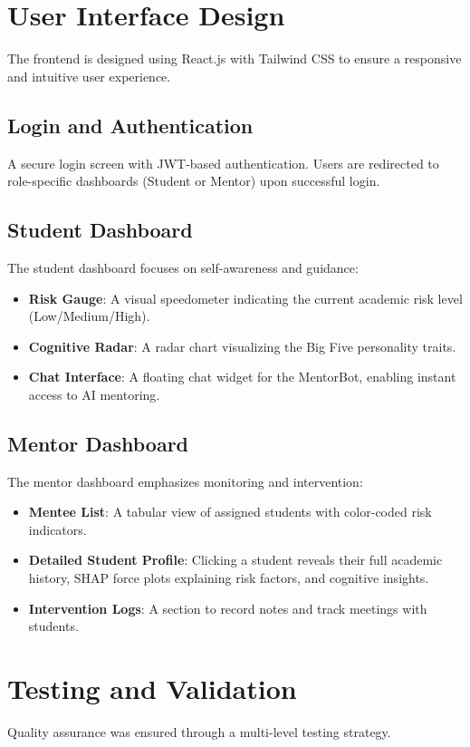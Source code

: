 \documentclass[12pt,a4paper]{report}
\begin{document}
\section{User Interface Design}
The frontend is designed using React.js with Tailwind CSS to ensure a responsive and intuitive user experience.

\subsection{Login and Authentication}
A secure login screen with JWT-based authentication. Users are redirected to role-specific dashboards (Student or Mentor) upon successful login.

\subsection{Student Dashboard}
The student dashboard focuses on self-awareness and guidance:
\begin{itemize}
    \item \textbf{Risk Gauge}: A visual speedometer indicating the current academic risk level (Low/Medium/High).
    \item \textbf{Cognitive Radar}: A radar chart visualizing the Big Five personality traits.
    \item \textbf{Chat Interface}: A floating chat widget for the MentorBot, enabling instant access to AI mentoring.
\end{itemize}

\subsection{Mentor Dashboard}
The mentor dashboard emphasizes monitoring and intervention:
\begin{itemize}
    \item \textbf{Mentee List}: A tabular view of assigned students with color-coded risk indicators.
    \item \textbf{Detailed Student Profile}: Clicking a student reveals their full academic history, SHAP force plots explaining risk factors, and cognitive insights.
    \item \textbf{Intervention Logs}: A section to record notes and track meetings with students.
\end{itemize}

\section{Testing and Validation}
Quality assurance was ensured through a multi-level testing strategy.
\end{document}
